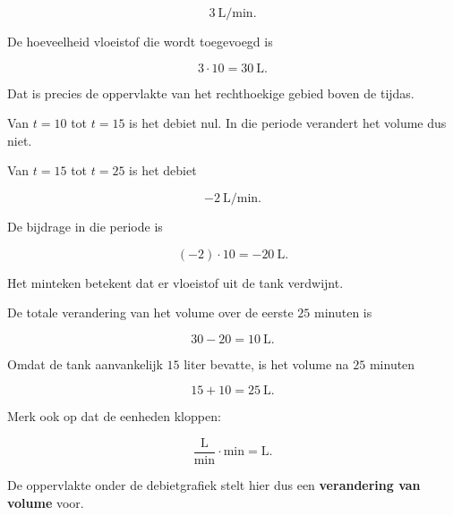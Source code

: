\documentclass{ximera}
\begin{document}
\begin{voorbeeld}
\[
3\ \mathrm{L/min}.
\]

De hoeveelheid vloeistof die wordt toegevoegd is

\[
3\cdot10=30\ \mathrm L.
\]

Dat is precies de oppervlakte van het rechthoekige gebied boven de
tijdas.

Van \(t=10\) tot \(t=15\) is het debiet nul. In die periode verandert
het volume dus niet.

Van \(t=15\) tot \(t=25\) is het debiet

\[
-2\ \mathrm{L/min}.
\]

De bijdrage in die periode is

\[
(-2)\cdot10=-20\ \mathrm L.
\]

Het minteken betekent dat er vloeistof uit de tank verdwijnt.

De totale verandering van het volume over de eerste \(25\) minuten is

\[
30-20=10\ \mathrm L.
\]

Omdat de tank aanvankelijk \(15\) liter bevatte, is het volume na
\(25\) minuten

\[
15+10=25\ \mathrm L.
\]

Merk ook op dat de eenheden kloppen:

\[
\frac{\mathrm L}{\mathrm{min}}
\cdot
\mathrm{min}
=
\mathrm L.
\]

De oppervlakte onder de debietgrafiek stelt hier dus een
\textbf{verandering van volume} voor.

\end{voorbeeld}


\end{document}
